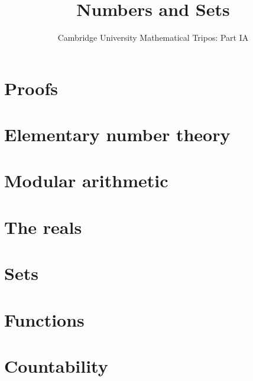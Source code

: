 \documentclass{article}
\title{Numbers and Sets}
\author{Cambridge University Mathematical Tripos: Part IA}
\begin{document}
\maketitle

\tableofcontentsnewpage{}

\section{Proofs}

\section{Elementary number theory}

\section{Modular arithmetic}

\section{The reals}

\section{Sets}

\section{Functions}

\section{Countability}

\end{document}
